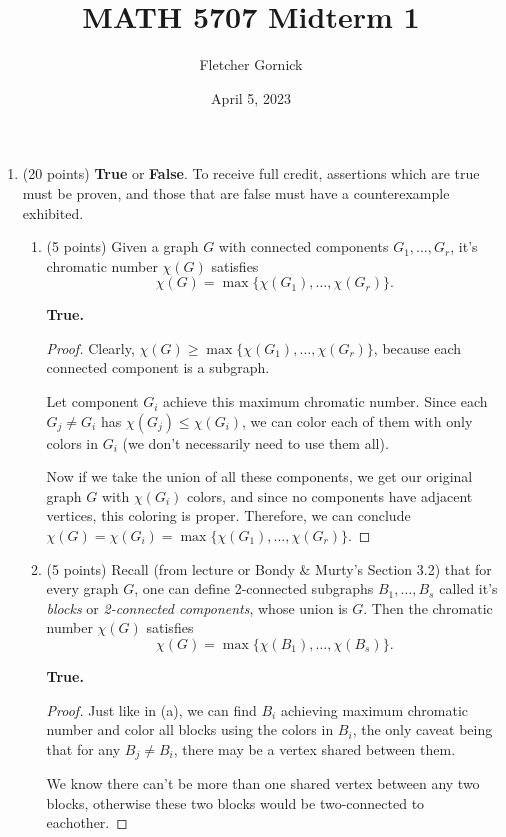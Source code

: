 \documentclass[11pt]{article}
\title{\vspace{-1.0cm}MATH 5707 Midterm 1}
\author{Fletcher Gornick}
\date{April 5, 2023}
\newcommand{\n}{\vspace{0.3cm}}
\begin{document}
\maketitle
  \begin{enumerate}
    \item (20 points) \textbf{True} or \textbf{False}.  To receive full credit, assertions which are true must be proven, and those that are false must have a counterexample exhibited.
      \begin{enumerate}[label=(\alph*)]
        \item (5 points) Given a graph \(G\) with connected components \(G_1, \hdots, G_r\), it's chromatic number \(\chi(G)\) satisfies 
          \[\chi(G) = \max \{\chi(G_1), \hdots, \chi(G_r)\}.\]

          \textbf{True.}
          \begin{proof}
            Clearly, \(\chi(G) \geq \max \{\chi(G_1), \hdots, \chi(G_r)\}\), because each connected component is a subgraph. \n

            Let component \(G_i\) achieve this maximum chromatic number.  Since each \(G_j \neq G_i\) has \(\chi(G_j) \leq \chi(G_i)\), we can color each of them with only colors in \(G_i\) (we don't necessarily need to use them all). \n

            Now if we take the union of all these components, we get our original graph \(G\) with \(\chi(G_i)\) colors, and since no components have adjacent vertices, this coloring is proper.  Therefore, we can conclude \(\chi(G) = \chi(G_i) = \max \{\chi(G_1), \hdots, \chi(G_r)\}\).
          \end{proof} \n
          

        \item (5 points) Recall (from lecture or Bondy \& Murty’s Section 3.2) that for every graph \(G\), one can define 2-connected subgraphs \(B_1, \hdots, B_s\) called it's \textit{blocks} or \textit{2-connected components}, whose union is \(G\).  Then the chromatic number \(\chi(G)\) satisfies
          \[\chi(G) = \max \{\chi(B_1), \hdots, \chi(B_s)\}.\]

          \textbf{True.}
          \begin{proof}
            Just like in (a), we can find \(B_i\) achieving maximum chromatic number and color all blocks using the colors in \(B_i\), the only caveat being that for any \(B_j \neq B_i\), there may be a vertex shared between them. \n

            We know there can't be more than one shared vertex between any two blocks, otherwise these two blocks would be two-connected to eachother. \n


\end{proof}
\end{enumerate}
\end{enumerate}
\end{document}
